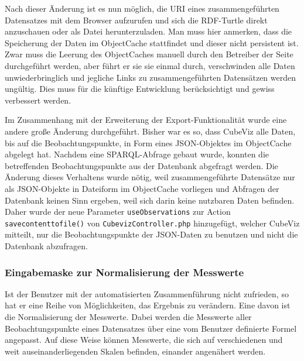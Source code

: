\documentclass[11pt]{article}
\newcommand{\com}[1]{\marginpar{\em {\small{#1}}}} %
\begin{document}
\noindent
Nach dieser Änderung ist es nun möglich,\com{Commit \\ 93ebed} die URI eines zusammengeführten Datensatzes mit dem Browser aufzurufen und sich die RDF-Turtle direkt anzuschauen oder als Datei herunterzuladen. Man muss hier anmerken, dass die Speicherung der Daten im ObjectCache stattfindet und dieser nicht persistent ist. Zwar muss die Leerung des ObjectCaches manuell durch den Betreiber der Seite durchgeführt werden, aber führt er sie sie einmal durch, verschwinden alle Daten unwiederbringlich und jegliche Links zu zusammengeführten Datensätzen werden ungültig. Dies muss für die künftige Entwicklung berücksichtigt und gewiss verbessert werden.

Im Zusammenhang mit der Erweiterung der Export-Funktionalität wurde eine andere große Änderung durchgeführt. Bisher war es so, dass CubeViz alle Daten, bis auf die Beobachtungspunkte, in Form eines JSON-Objektes im ObjectCache abgelegt hat. Nachdem eine SPARQL-Abfrage gebaut wurde, konnten die betreffenden Beobachtungspunkte aus der Datenbank abgefragt werden. Die Änderung dieses Verhaltens wurde nötig, weil zusammengeführte Datensätze nur als JSON-Objekte in Dateiform im ObjectCache vorliegen und Abfragen der Datenbank keinen Sinn ergeben, weil sich darin keine nutzbaren Daten befinden. Daher wurde der neue Parameter \verb|useObservations| zur Action \verb|savecontenttofile()| von \verb|CubevizController.php| hinzugefügt, welcher CubeViz mitteilt, nur die Beobachtungspunkte der JSON-Daten zu benutzen und nicht die Datenbank abzufragen.


%
%
\subsubsection{Eingabemaske zur Normalisierung der Messwerte}

Ist der Benutzer mit der automatisierten Zusammenführung nicht zufrieden, so hat er eine Reihe von Möglichkeiten, das Ergebnis zu verändern. Eine davon ist die Normalisierung der Messwerte. Dabei werden die Messwerte aller Beobachtungspunkte eines Datensatzes über eine vom Benutzer definierte Formel angepasst. Auf diese Weise können Messwerte, die sich auf verschiedenen und weit auseinanderliegenden Skalen befinden, einander angenähert werden. \\
\end{document}
